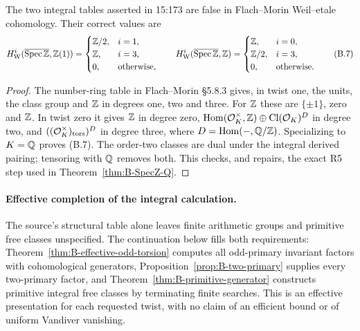 \begin{proposition}\label{prop:B-integral-errors}
The two integral tables asserted in 15:173 are false in Flach--Morin
Weil--etale cohomology.  Their correct values are
\[
H^i_{\mathrm W}(\overline{\operatorname{Spec}\mathbb Z},\mathbb Z(1))=
\begin{cases}\mathbb Z/2,&i=1,\\\mathbb Z,&i=3,\\0,&\text{otherwise},\end{cases}
\qquad
H^i_{\mathrm W}(\overline{\operatorname{Spec}\mathbb Z},\mathbb Z)=
\begin{cases}\mathbb Z,&i=0,\\\mathbb Z/2,&i=3,\\0,&\text{otherwise}.\end{cases}\tag{B.7}
\]
\end{proposition}
\begin{proof}
The number-ring table in Flach--Morin \S5.8.3 gives, in twist one,
the units, the class group and \(\mathbb Z\) in degrees one, two and three.
For \(\mathbb Z\) these are \(\{\pm1\}\), zero and \(\mathbb Z\).
In twist zero it gives \(\mathbb Z\) in degree zero,
\(\operatorname{Hom}(\mathcal O_K^\times,\mathbb Z)\oplus\operatorname{Cl}(\mathcal O_K)^D\)
in degree two, and \(((\mathcal O_K^\times)_{\rm tors})^D\) in degree
three, where \(D=\operatorname{Hom}(-,\mathbb Q/\mathbb Z)\).  Specializing to \(K=\mathbb Q\)
proves (B.7).  The order-two classes are dual under the integral derived
pairing; tensoring with \(\mathbb Q\) removes both.  This checks, and repairs,
the exact R5 step used in Theorem~\ref{thm:B-SpecZ-Q}.
\end{proof}

\paragraph{Effective completion of the integral calculation.}
The source's structural table alone leaves finite arithmetic groups
and primitive free classes unspecified.  The continuation below fills
both requirements: Theorem~\ref{thm:B-effective-odd-torsion} computes
all odd-primary invariant factors with cohomological generators,
Proposition~\ref{prop:B-two-primary} supplies every two-primary
factor, and Theorem~\ref{thm:B-primitive-generator} constructs
primitive integral free classes by terminating finite searches.
This is an effective presentation for each requested twist, with no
claim of an efficient bound or of uniform Vandiver vanishing.

